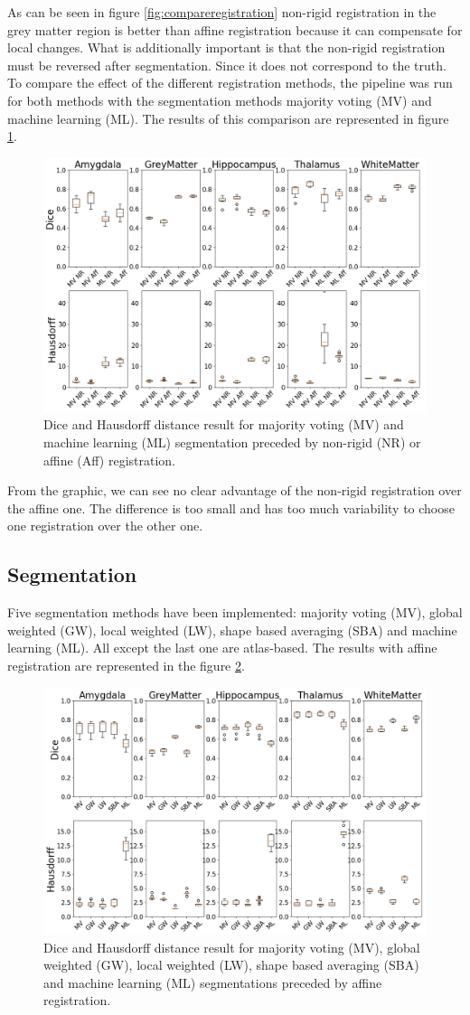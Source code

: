 As can be seen in figure \ref{fig:compareregistration} non-rigid registration in the grey matter region is better than affine registration because it can compensate for local changes. What is additionally important is that the non-rigid registration must be reversed after segmentation. Since it does not correspond to the truth.
To compare the effect of the different registration methods, the pipeline was run for both methods with the segmentation methods majority voting (MV) and machine learning (ML). The results of this comparison are represented in figure \ref{fig:boxplotReg}.

\begin{figure}[h!]
	\centering
	\includegraphics[width = .48 \textwidth]{img/boxplotComparisonNRAff2}
	\caption{Dice and Hausdorff distance result for majority voting (MV) and machine learning (ML) segmentation preceded by non-rigid (NR) or affine (Aff) registration.}
	\label{fig:boxplotReg}
\end{figure}

From the graphic, we can see no clear advantage of the non-rigid registration over the affine one. The difference is too small and has too much variability to choose one registration over the other one.

\subsection*{Segmentation}
Five segmentation methods have been implemented: majority voting (MV), global weighted (GW), local weighted (LW), shape based averaging (SBA) and machine learning (ML). All except the last one are atlas-based. The results with affine registration are represented in the figure \ref{fig:boxplotAff}.

\begin{figure}[h!]
	\centering
	\includegraphics[width = .48 \textwidth]{img/boxplot_Affine_all2}
	\caption{Dice and Hausdorff distance result for majority voting (MV), global weighted (GW), local weighted (LW), shape based averaging (SBA) and machine learning (ML) segmentations preceded by affine registration.}
	\label{fig:boxplotAff}
\end{figure}

